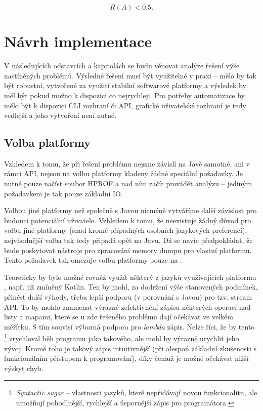 \begin{equation}
    R(A) < 0.5.
\end{equation}

\chapter{Návrh implementace}

V následujících odstavcích a kapitolách se budu věnovat analýze řešení výše nastíněných problémů. Výsledné řešení musí být využitelné v praxi -- mělo by tak být robustní, vytvořené za využití stabilní softwarové platformy a výsledek by měl být pokud možno k dispozici co nejrychleji. Pro potřeby automatizace by mělo být k dispozici CLI rozhraní či API, grafické uživatelské rozhraní je tedy vedlejší a jeho vytvoření není nutné.

\section{Volba platformy}
Vzhledem k tomu, že při řešení problému nejsme závislí na Javě samotné, ani v rámci API, nejsou na volbu platformy kladeny žádné speciální požadavky. Je nutné pouze načíst soubor HPROF a nad ním začít provádět analýzu -- jediným požadavkem je tak pouze základní IO.

Volbou jiné platformy než  společně s Javou nicméně vytváříme další závislost pro budoucí potenciální uživatele. Vzhledem k tomu, že neexistuje žádný důvod pro volbu jiné platformy (snad kromě případných osobních jazykových preferencí), nejvhodnější volba tak tedy připadá opět na Javu. Dá se navíc předpokládat, že bude poskytovat nástroje pro zpracování memory dumpu pro vlastní platformu. Tento požadavek tak omezuje volbu platformy pouze na .

Teoreticky by bylo možné rovněž využít některý z jazyků využívajících platformu , např. již zmíněný Kotlin. Ten by mohl, za dodržení výše stanovených podmínek, přinést další výhody, třeba lepší podporu (v porovnání s Javou) pro tzv. stream API. To by mohlo znamenat výrazné zefektivnění zápisu některých operací nad listy a mapami, které se u zde řešeného problému dají očekávat ve velkém měřítku. S tím souvisí výborná podpora pro \textit{lambda} zápis. Nelze říci, že by tento \footnote{\textit{Syntactic sugar} -- vlastnosti jazyků, které nepřidávají novou funkcionalitu, ale umožňují pohodlnější, rychlejší a úspornější zápis pro programátora.} zrychloval běh programu jako takového, ale mohl by výrazně urychlit jeho vývoj. Kromě toho je takový zápis intuitivnější (při alespoń základní zkušenosti s funkcionálním přístupem k programování), díky čemuž je možné očekávat nižší výskyt chyb.


